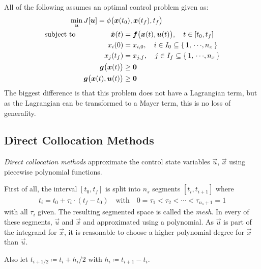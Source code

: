 		All of the following assumes an optimal control problem given as:
		\begin{align*}
			\min_{\bm{u}} &\, J[\bm{u}] = \phi\big(\bm{x}(t_0), \bm{x}(t_f), t_f\big) \\
			\mathrm{subject~to}\quad &\,
				\begin{alignedat}[t]{2}
					\dot{\bm{x}}(t) &= \bm{f}\big(\bm{x}(t), \bm{u}(t)\big),\quad t \in [t_0, t_f] \\
					x_i(0) &= x_{i, 0},\quad i \in I_0 \subseteq \{\, 1,\,\cdots\!,n_x \,\} \\
					x_j(t_f) &= x_{j, f},\quad j \in I_f \subseteq \{\, 1,\,\cdots\!,n_x \,\} \\
					\bm{g}\big(\bm{x}(t)\big) &\geq \bm{0} \\
					\bm{g}\big(\bm{x}(t), \bm{u}(t)\big) &\geq \bm{0}
				\end{alignedat}
		\end{align*}
		The biggest difference is that this problem does not have a Lagrangian term, but as the Lagrangian can be transformed to a Mayer term, this is no loss of generality.

		\subsection{Direct Collocation Methods}
			\emph{Direct collocation methods} approximate the control state variables \(\vec{u}\), \(\vec{x}\) using piecewise polynomial functions.

			First of all, the interval \( [t_0, t_f] \) is split into \(n_s\) segments \( [t_i, t_{i + 1}] \) where
			\begin{align*}
				t_i = t_0 + \tau_i \cdot (t_f - t_0) \quad\text{with}\quad 0 = \tau_1 < \tau_2 < \cdots < \tau_{n_s + 1} = 1
			\end{align*}
			with all \(\tau_i\) given. The resulting segmented space is called the \emph{mesh}. In every of these segments, \(\vec{u}\) and \(\vec{x}\) and approximated using a polynomial. As \(\vec{u}\) is part of the integrand for \(\vec{x}\), it is reasonable to choose a higher polynomial degree for \(\vec{x}\) than \(\vec{u}\).

			Also let \( t_{i + 1/2} \coloneqq t_i + h_i / 2 \) with \( h_i \coloneqq t_{i + 1} - t_i \).

